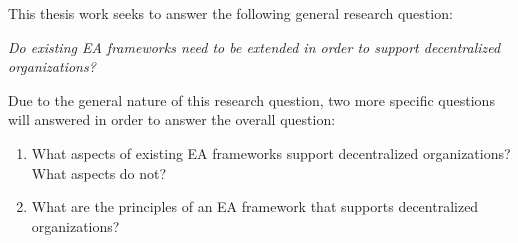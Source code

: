 This thesis work seeks to answer the following general research question:
\begin{quoting}
\textit{Do existing EA frameworks need to be extended in order to support decentralized organizations?}
\end{quoting}

Due to the general nature of this research question, two more specific questions will answered in order to answer the overall question:
\begin{enumerate}
\item What aspects of existing EA frameworks support decentralized organizations? What aspects do not?
\label{req:1}
\item What are the principles of an EA framework that supports decentralized organizations?
\label{req:2}
\end{enumerate}
